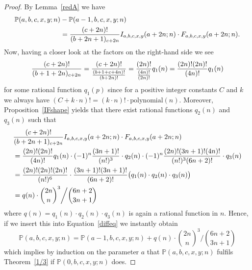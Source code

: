 \documentclass[10pt,a4paper]{amsart}
\begin{document}
\begin{proof}
    By Lemma~\ref{redA} we have
     \begin{align}
        \mathbb{P}(a,b,c,x,y;n)&-\mathbb{P}(a-1,b,c,x,y;n) \label{diffeq}\\
        &=\frac{(c+2n)!}{(b+2n+1)_{c+2n}}I_{a,b,c,x,y}(a+2n;n)\cdot F_{a,b,c,x,y}(a+2n;n).\notag
    \end{align}
    Now, having a closer look at the factors on the right-hand side we see
    \begin{align}
        \frac{(c+2n)!}{(b+1+2n)_{c+2n}}=\frac{(c+2n)!}{\frac{(b+1+c+4n)!}{(b+2n)!}}=\frac{(2n)!}{\frac{(4n)!}{(2n)!}}q_1(n)=\frac{(2n)!(2n)!}{(4n)!}q_1(n)\notag
    \end{align}
    for some rational function $q_1(p)$ since for a positive integer constants $C$ and $k$ we always have $(C+k\cdot n)!=(k\cdot n)!\cdot \text{polynomial}(n)$. Moreover, Proposition~\ref{IFshape} yields that there exist rational functions $q_2(n)$ and $q_3(n)$ such that
    \begin{align}
        &\frac{(c+2n)!}{(b+2n+1)_{c+2n}}I_{a,b,c,x,y}(a+2n;n)\cdot F_{a,b,c,x,y}(a+2n;n)\notag\\
        &=\frac{(2n)!(2n)!}{(4n)!}q_1(n)\cdot (-1)^n\frac{(3n+1)!}{(n!)^3}\cdot q_2(n)\cdot (-1)^n\frac{(2n)!(3n+1)!(4n)!}{(n!)^3(6n+2)!}\cdot q_3(n)\notag\\
        &=\frac{(2n)!(2n)!(2n)!}{(n!)^6}\cdot \frac{(3n+1)!(3n+1)!}{(6n+2)!}\big(q_1(n)\cdot q_2(n)\cdot q_3(n)\big)\notag\\
        &=q(n)\cdot \binom{2n}{n}^3\bigg/\binom{6n+2}{3n+1}\notag
    \end{align}
    where $q(n)=q_1(n)\cdot q_2(n)\cdot q_3(n)$ is again a rational function in $n.$ Hence, if we insert this into Equation~\eqref{diffeq} we instantly obtain
    \[\mathbb{P}(a,b,c,x,y;n)=\mathbb{P}(a-1,b,c,x,y;n)+q(n)\cdot \binom{2n}{n}^3\bigg/\binom{6n+2}{3n+1}\]
    which implies by induction on the parameter $a$ that $\mathbb{P}(a,b,c,x,y;n)$ fulfils Theorem~\ref{1/3} if $\mathbb{P}(0,b,c,x,y;n)$ does.
\end{proof}
\end{document}
